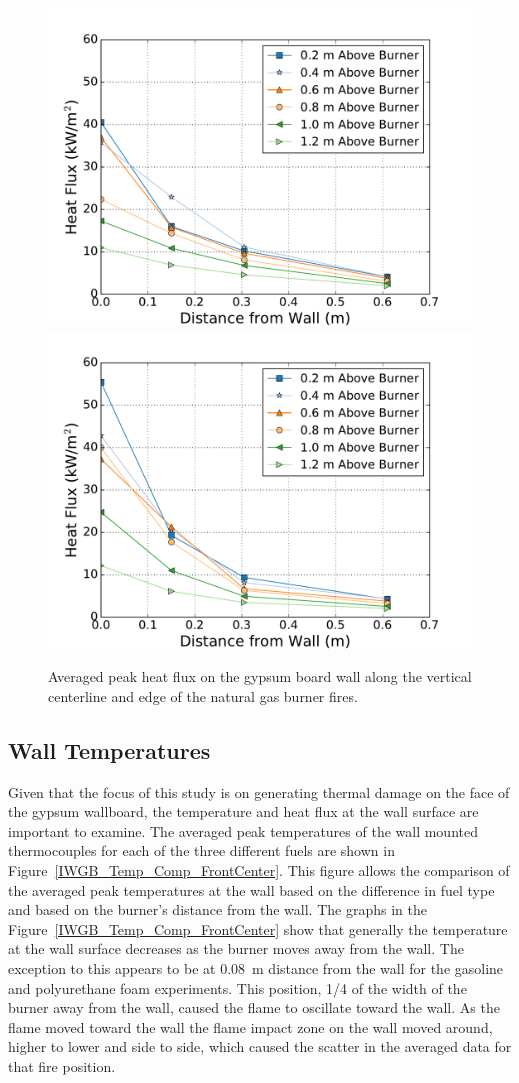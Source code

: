 \documentclass[twoside]{uocthesis}
\begin{document}
\begin{figure}[ht!]
	\centering
	\includegraphics[width=.625\columnwidth]{../Figures/IWGB_NG_HF_Center_Avg}\\
	\includegraphics[width=.625\columnwidth]{../Figures/IWGB_NG_HF_Offset_Avg}\\
	\caption[Averaged peak heat flux on the gypsum board wall for the natural gas burner fires.]{Averaged peak heat flux on the gypsum board wall along the vertical centerline and edge of the natural gas burner fires.}
	\label{IWGB_NG_HF_CandEAvg}
\end{figure}

\clearpage

\subsection{Wall Temperatures}

Given that the focus of this study is on generating thermal damage on the face of the gypsum wallboard, the temperature and heat flux at the wall surface are important to examine.  The averaged peak temperatures of the wall mounted thermocouples for each of the three different fuels are shown in Figure~\ref{IWGB_Temp_Comp_FrontCenter}. This figure allows the comparison of the averaged peak temperatures at the wall based on the difference in fuel type and based on the burner's distance from the wall.  The graphs in the Figure~\ref{IWGB_Temp_Comp_FrontCenter} show that generally the temperature at the wall surface decreases as the burner moves away from the wall.  The exception to this appears to be at 0.08~m distance from the wall for the gasoline and polyurethane foam experiments.  This position, 1/4 of the width of the burner away from the wall, caused the flame to oscillate toward the wall. As the flame moved toward the wall the flame impact zone on the wall moved around, higher to lower and side to side, which caused the scatter in the averaged data for that fire position.    
\end{document}
